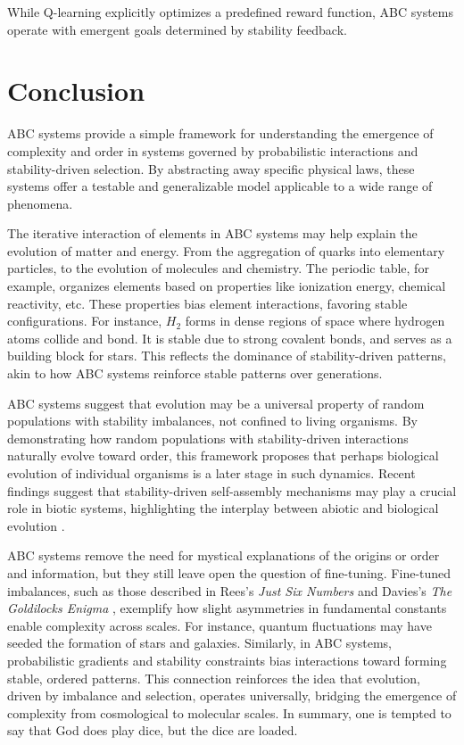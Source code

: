\documentclass[entropy,article,submit,pdftex,moreauthors]{Definitions/mdpi}
\begin{document}
While Q-learning explicitly optimizes a predefined reward function, ABC systems operate with emergent goals determined by stability feedback. 

\section{Conclusion}

ABC systems provide a simple framework for understanding the emergence of complexity and order in systems governed by probabilistic interactions and stability-driven selection. By abstracting away specific physical laws, these systems offer a testable and generalizable model applicable to a wide range of phenomena. 

The iterative interaction of elements in ABC systems may help explain the evolution of matter and energy. From the aggregation of quarks into elementary particles, to the evolution of molecules and chemistry. The periodic table, for example, organizes elements based on properties like ionization energy, chemical reactivity, etc. These properties bias element interactions, favoring stable configurations. For instance, \( H_2 \) forms in dense regions of space where hydrogen atoms collide and bond. It is stable due to strong covalent bonds, and serves as a building block for stars. This reflects the dominance of stability-driven patterns, akin to how ABC systems reinforce stable patterns over generations. 

ABC systems suggest that evolution may be a universal property of random populations with stability imbalances, not confined to living organisms. By demonstrating how random populations with stability-driven interactions naturally evolve toward order, this framework proposes that perhaps biological evolution of individual organisms is a later stage in such dynamics. Recent findings suggest that stability-driven self-assembly mechanisms may play a crucial role in biotic systems, highlighting the interplay between abiotic and biological evolution \cite{davies2022selfassembly}.

ABC systems remove the need for mystical explanations of the origins or order and information, but they still leave open the question of fine-tuning. Fine-tuned imbalances, such as those described in Rees's \textit{Just Six Numbers} \cite{rees2000just} and Davies's \textit{The Goldilocks Enigma} \cite{davies2006goldilocks}, exemplify how slight asymmetries in fundamental constants enable complexity across scales. For instance, quantum fluctuations may have seeded the formation of stars and galaxies. Similarly, in ABC systems, probabilistic gradients and stability constraints bias interactions toward forming stable, ordered patterns. This connection reinforces the idea that evolution, driven by imbalance and selection, operates universally, bridging the emergence of complexity from cosmological to molecular scales. In summary, one is tempted to say that God does play dice, but the dice are loaded.
\end{document}
